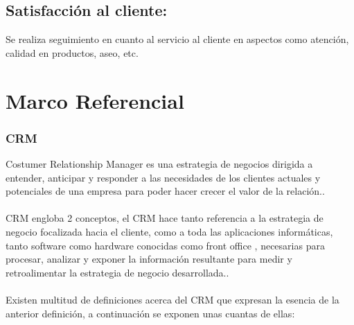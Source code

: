 \subsection{Satisfacci\'on al cliente:}Se realiza seguimiento en cuanto al servicio al cliente en aspectos como atenci\'on, calidad en productos, aseo, etc.%
%
\section{Marco Referencial}
%
\subsubsection{CRM} Costumer Relationship Manager es una estrategia de negocios dirigida a entender, anticipar y responder a las necesidades de los clientes actuales y potenciales de una empresa para poder hacer crecer el valor de la relaci\'on..%
\\%
\\%
CRM engloba 2 conceptos, el CRM hace tanto referencia a la estrategia de negocio focalizada hacia el cliente, como a toda las aplicaciones inform\'aticas, tanto software como hardware conocidas como front office , necesarias para procesar, analizar y exponer la informaci\'on resultante para medir y retroalimentar la estrategia de negocio desarrollada..%
\\%
\\%
Existen multitud de definiciones acerca del CRM que expresan la esencia de la anterior definici\'on, a continuaci\'on se exponen unas cuantas de ellas:%
\\%
